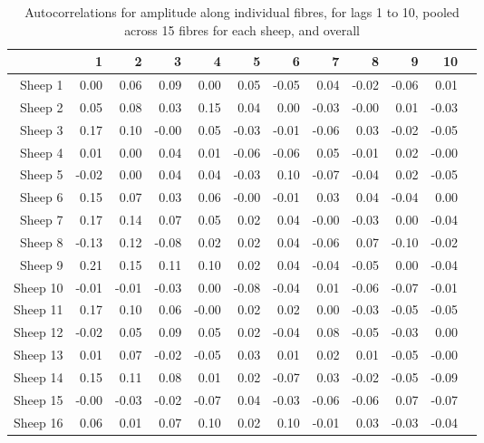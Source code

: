 \begin{table}[htp]
\centering
\caption{Autocorrelations for amplitude along individual fibres, for lags 1 to 10,  pooled across 15 fibres for each sheep, and overall}
\label{tab:acfa}
\vspace{0.1in}
\begin{tabular}{rrrrrrrrrrrr}
  \hline
 & 1 & 2 & 3 & 4 & 5 & 6 & 7 & 8 & 9 & 10  \\ 
  \hline
Sheep 1   & 0.00 & 0.06 & 0.09 & 0.00 & 0.05 & -0.05 & 0.04 & -0.02 & -0.06 & 0.01 \\ 
Sheep  2   & 0.05 & 0.08 & 0.03 & 0.15 & 0.04 & 0.00 & -0.03 & -0.00 & 0.01 & -0.03 \\ 
Sheep  3   & 0.17 & 0.10 & -0.00 & 0.05 & -0.03 & -0.01 & -0.06 & 0.03 & -0.02 & -0.05 \\ 
Sheep  4   & 0.01 & 0.00 & 0.04 & 0.01 & -0.06 & -0.06 & 0.05 & -0.01 & 0.02 & -0.00 \\ 
Sheep  5   & -0.02 & 0.00 & 0.04 & 0.04 & -0.03 & 0.10 & -0.07 & -0.04 & 0.02 & -0.05 \\ 
Sheep  6   & 0.15 & 0.07 & 0.03 & 0.06 & -0.00 & -0.01 & 0.03 & 0.04 & -0.04 & 0.00 \\ 
Sheep  7   & 0.17 & 0.14 & 0.07 & 0.05 & 0.02 & 0.04 & -0.00 & -0.03 & 0.00 & -0.04 \\ 
Sheep  8   & -0.13 & 0.12 & -0.08 & 0.02 & 0.02 & 0.04 & -0.06 & 0.07 & -0.10 & -0.02 \\ 
Sheep  9   & 0.21 & 0.15 & 0.11 & 0.10 & 0.02 & 0.04 & -0.04 & -0.05 & 0.00 & -0.04 \\  \hline
Sheep  10   & -0.01 & -0.01 & -0.03 & 0.00 & -0.08 & -0.04 & 0.01 & -0.06 & -0.07 & -0.01 \\ 
Sheep  11   & 0.17 & 0.10 & 0.06 & -0.00 & 0.02 & 0.02 & 0.00 & -0.03 & -0.05 & -0.05 \\ 
Sheep  12   & -0.02 & 0.05 & 0.09 & 0.05 & 0.02 & -0.04 & 0.08 & -0.05 & -0.03 & 0.00 \\ 
Sheep  13   & 0.01 & 0.07 & -0.02 & -0.05 & 0.03 & 0.01 & 0.02 & 0.01 & -0.05 & -0.00 \\ 
Sheep  14   & 0.15 & 0.11 & 0.08 & 0.01 & 0.02 & -0.07 & 0.03 & -0.02 & -0.05 & -0.09 \\ 
Sheep  15   & -0.00 & -0.03 & -0.02 & -0.07 & 0.04 & -0.03 & -0.06 & -0.06 & 0.07 & -0.07 \\  \hline
Sheep  16   & 0.06 & 0.01 & 0.07 & 0.10 & 0.02 & 0.10 & -0.01 & 0.03 & -0.03 & -0.04 \\ 

\end{tabular}
\end{table}

